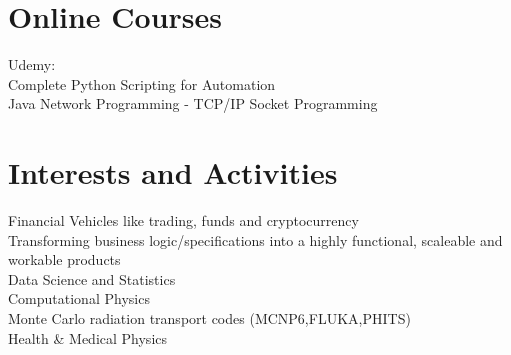 \documentclass[a4paper,10pt]{article}
\begin{document}
\section{\normalsize Online Courses}
\small Udemy:\\
\footnotesize Complete Python Scripting for Automation\\
\footnotesize Java Network Programming - TCP/IP Socket Programming

\section{\normalsize Interests and Activities}
\footnotesize Financial Vehicles like trading, funds and cryptocurrency\\
\footnotesize Transforming business logic/specifications into a highly functional, scaleable and workable products\\
\footnotesize Data Science and Statistics\\
\footnotesize Computational Physics\\
\footnotesize Monte Carlo radiation transport codes (MCNP6,FLUKA,PHITS)\\
\footnotesize Health \& Medical Physics\\
\end{document}

